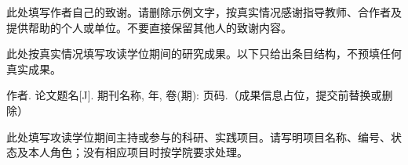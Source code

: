 \begin{acknowledgements}
此处填写作者自己的致谢。请删除示例文字，按真实情况感谢指导教师、合作者及提供帮助的个人或单位。不要直接保留其他人的致谢内容。
\end{acknowledgements}
\begin{publications}
\noindent 此处按真实情况填写攻读学位期间的研究成果。以下只给出条目结构，不预填任何真实成果。
\begin{enumerate}[label={[\arabic*]},leftmargin=2em]
  \item 作者. 论文题名[J]. 期刊名称, 年, 卷(期): 页码.（成果信息占位，提交前替换或删除）
\end{enumerate}
\end{publications}
\begin{projects}
此处填写攻读学位期间主持或参与的科研、实践项目。请写明项目名称、编号、状态及本人角色；没有相应项目时按学院要求处理。
\end{projects}
